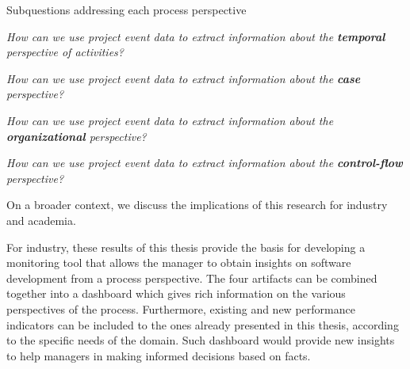 \begin{question}{Subquestions addressing each process perspective}
	\begin{description}[\bfseries RQ 1.]
		\item[\bfseries RQ1.] \emph{How can we use project event data to extract information about the \textbf{temporal} perspective of activities?} 
		
		\item[\bfseries RQ2.] \emph{How can we use project event data to extract information about the \textbf{case} perspective?} 
		
		\item[\bfseries RQ3.] \emph{How can we use project event data to extract information about the \textbf{organizational} perspective?} 
		
		\item[\bfseries RQ4.] \emph{How can we use project event data to extract information about the \textbf{control-flow} perspective?} 
		
	\end{description}
\end{question}


On a broader context, we discuss the implications of this research for industry and academia. 

For industry, these results of this thesis provide the basis for developing a monitoring tool that allows the manager to obtain insights on software development from a process perspective. The four artifacts can be combined together into a dashboard which gives rich information on the various perspectives of the process. Furthermore, existing and new performance indicators can be included to the ones already presented in this thesis, according to the specific needs of the domain. Such dashboard would provide new insights to help managers in making informed decisions based on facts. 

